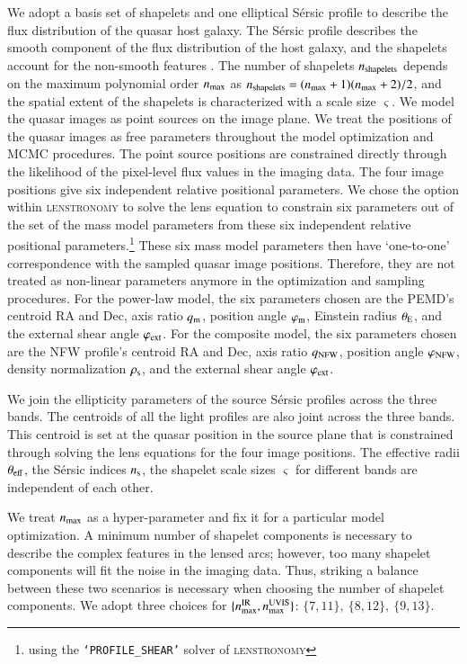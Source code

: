 \documentclass[longauth]{aa}
\newcommand{\ajs}[1]{{{#1}}}
\newcommand{\reply}[1]{{{#1}}}
\begin{document}
We adopt a basis set of shapelets and one elliptical S\'ersic profile to describe the flux distribution of the quasar host galaxy. The S\'ersic profile describes the smooth component of the flux distribution of the host galaxy, and the shapelets account for the non-smooth features \citep{Refregier03, Birrer15}. The number of shapelets $n_{\rm shapelets}$ depends on the maximum polynomial order $n_{\rm max}$ as $n_{\rm shapelets} = (n_{\rm max}+1)(n_{\rm max} + 2)/2$, and the spatial extent of the shapelets is characterized with a scale size $\varsigma$. We model the quasar images as point sources on the image plane. \reply{We treat the positions of the quasar images as free parameters throughout the model optimization and MCMC procedures. The point source positions are constrained directly through the likelihood of the pixel-level flux values in the imaging data. The four image positions give six independent relative positional parameters. We chose the option within \textsc{lenstronomy} to solve the lens equation to constrain six parameters out of the set of the mass model parameters from these six independent relative positional parameters.\footnote{using the \texttt{`PROFILE\_SHEAR'} solver of \textsc{lenstronomy}} These six mass model parameters then have `one-to-one' correspondence with the sampled quasar image positions. Therefore, they are not treated as non-linear parameters anymore in the optimization and sampling procedures. For the power-law model, the six parameters chosen are the PEMD's centroid RA and Dec, axis ratio $q_{\rm m}$, position angle $\varphi_{\rm m}$, Einstein radius $\theta_{\rm E}$, and the external shear angle $\varphi_{\rm ext}$. For the composite model, the six parameters chosen are the NFW profile's centroid RA and Dec, axis ratio $q_{\rm NFW}$, position angle $\varphi_{\rm NFW}$, density normalization $\rho_{\rm s}$, and the external shear angle $\varphi_{\rm ext}$.}

We join the ellipticity parameters of the source S\'ersic profiles across the three bands. The centroids of all the light profiles are also joint across the three bands. \ajs{This centroid is set at the quasar position in the source plane that is} constrained through solving the lens equations for the four image positions. The effective radii $\theta_{\rm eff}$, the S\'ersic indices $n_{\rm s}$, the shapelet scale sizes $\varsigma$ for different bands are independent of each other.

We treat $n_{\rm max}$ as a hyper-parameter and fix it for a particular model optimization. A minimum number of shapelet components is necessary to describe the complex features in the lensed arcs; however, too many shapelet components will fit the noise in the imaging data. Thus, striking a balance between these two scenarios is necessary when choosing the number of shapelet components. We adopt three choices for $\{n_{\rm max}^{\rm IR}, n_{\rm max}^{\rm UVIS} \}$: $\{7, 11\},\ \{8, 12\},\ \{9, 13\}$. 
\end{document}
